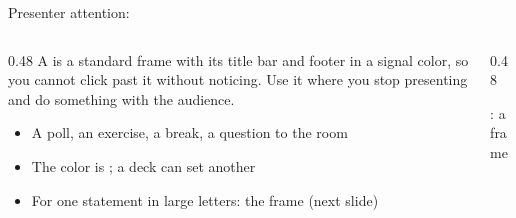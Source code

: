 
\begin{highlightframe}{Presenter attention: }
	\begin{columns}[T,onlytextwidth]
		\begin{column}{0.48\linewidth}
			\small
			A  is a standard frame with its title bar and
			footer in a signal color, so you cannot click past it without
			noticing. Use it where you stop presenting and do something with the
			audience.
			\par\medskip
			\begin{itemize}
				\item A poll, an exercise, a break, a question to the room
				\item The color is ; a deck can set another
				\item For one statement in large letters: the  frame (next slide)
			\end{itemize}
		\end{column}
		\begin{column}{0.48\linewidth}
			\par\bigskip
			: a  frame\par\smallskip
		\end{column}
	\end{columns}
\end{highlightframe}
